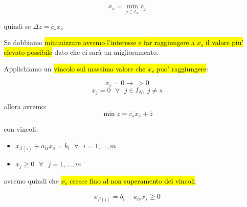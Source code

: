 $$x_s = \min_{j \in I_N} \overline{c}_j$$

quindi se $\Delta z = \overline{c}_s x_s$

Se dobbiamo \hl{minimizzare avremo l'interesse e far raggiungere a $x_s$ il valore piu' elevato possibile} dato che ci sarà un miglioramento.

Applichiamo un \hl{vincolo sul massimo valore che $x_s$ puo' raggiungere}:

$$x_s = 0 \to\ > 0$$
$$x_j = 0\ \ \ \forall\ \ \ j \in I_N,\ j \neq s$$

allora avremo:
$$\min z = \overline{c}_s x_s + \overline{z}$$

con vincoli:

\begin{itemize}
	\item $x_{\beta(i)} + \overline{a}_{is}x_s = \overline{b}_i\ \ \ \forall\ \ \ i = 1, ..., m$
	\item $x_j \geq 0\ \ \ \forall\ \ \ j = 1, ..., m$
\end{itemize}

avremo quindi che \hl{$x_s$ cresce fino al non superamento dei vincoli}:

$$x_{\beta(i)} = \overline{b}_i - \overline{a}_{is}x_s \geq 0$$

